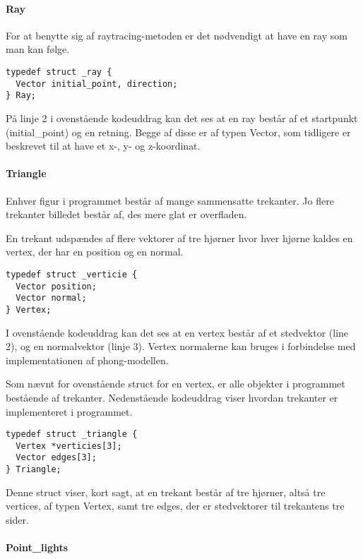 \paragraph{Ray}
For at benytte sig af raytracing-metoden er det nødvendigt at have en ray som man kan følge. 

\begin{lstlisting}[style=Cstyle, caption=Struct til ray]
typedef struct _ray {
  Vector initial_point, direction;
} Ray;
\end{lstlisting}

På linje 2 i ovenstående kodeuddrag kan det ses at en ray består af et startpunkt (initial\_point) og en retning. Begge af disse er af typen Vector, som tidligere er beskrevet til at have et x-, y- og z-koordinat.

\paragraph{Triangle}
Enhver figur i programmet består af mange sammensatte trekanter. Jo flere trekanter billedet består af, des mere glat er overfladen.

En trekant udspændes af flere vektorer af tre hjørner hvor hver hjørne kaldes en vertex, der har en position og en normal.
    
\begin{lstlisting}[style=Cstyle, caption=Struct til vertex]
typedef struct _verticie {
  Vector position;
  Vector normal;
} Vertex;
\end{lstlisting}

I ovenstående kodeuddrag kan det ses at en vertex består af et stedvektor (line 2), og en normalvektor (linje 3). Vertex normalerne kan bruges i forbindelse med implementationen af phong-modellen.

Som nævnt for ovenstående struct for en vertex, er alle objekter i programmet bestående af trekanter. Nedenstående kodeuddrag viser hvordan trekanter er implementeret i programmet.
    
\begin{lstlisting}[style=Cstyle, caption=Struct til triangle]
typedef struct _triangle {
  Vertex *verticies[3];
  Vector edges[3];
} Triangle;
\end{lstlisting}

Denne struct viser, kort sagt, at en trekant består af tre hjørner, altså tre vertices, af typen Vertex, samt tre edges, der er stedvektorer til trekantens tre sider. 

\paragraph{Point\_lights}

